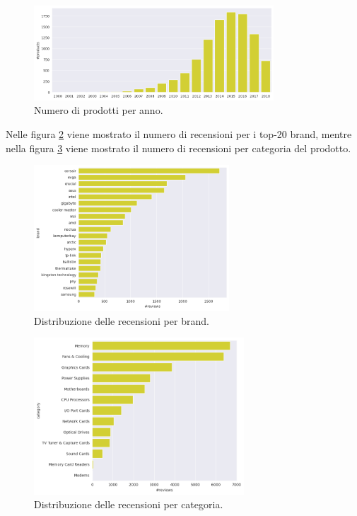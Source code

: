 \begin{figure}[p]
    \centering
    \includegraphics[width=0.8\textwidth]{images/eda/eda_number_products.png}
    \caption{Numero di prodotti per anno.}
    \label{fig:eda_number_products}
\end{figure}


Nelle figura \ref{fig:eda_brand_reviews} viene mostrato il numero di recensioni
per i top-20 brand, mentre nella figura \ref{fig:eda_category_reviews} viene mostrato
il numero di recensioni per categoria del prodotto.

\begin{figure}[p]
    \centering
    \includegraphics[width=0.65\textwidth]{images/eda/eda_reviews_brand.png}
    \caption{Distribuzione delle recensioni per brand.}
    \label{fig:eda_brand_reviews}
\end{figure}

\begin{figure}[p]
    \centering
    \includegraphics[width=0.7\textwidth]{images/eda/eda_reviews_category.png}
    \caption{Distribuzione delle recensioni per categoria.}
    \label{fig:eda_category_reviews}
\end{figure}

